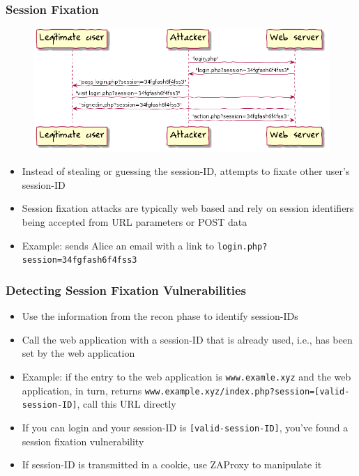 
\begin{frame}
    \frametitle{Session Fixation}
    \begin{figure}[htb]
        \centering
        \includegraphics[scale=.5]{uml/session-fixation.png}
    \end{figure}
    \begin{itemize}
        \item Instead of stealing or guessing the session-ID, \attacker attempts to fixate other user's session-ID
        \item Session fixation attacks are typically web based and rely on session identifiers being accepted from URL parameters or POST data
        \item Example: \attacker sends Alice an email with a link to \texttt{login.php?session=34fgfash6f4fss3}
    \end{itemize}
\end{frame}

\begin{frame}
    \frametitle{Detecting Session Fixation Vulnerabilities}
    \begin{itemize}
        \item Use the information from the recon phase to identify session-IDs
        \item Call the web application with a session-ID that is already used, i.e., has been set by the web application
        \item Example: if the entry to the web application is \texttt{www.examle.xyz} and the web application, in turn, returns \texttt{www.example.xyz/index.php?session=[valid-session-ID]}, call this URL directly
        \item If you can login and your session-ID is \texttt{[valid-session-ID]}, you've found a session fixation vulnerability
        \item If session-ID is transmitted in a cookie, use ZAProxy to manipulate it   
    \end{itemize}
\end{frame}

